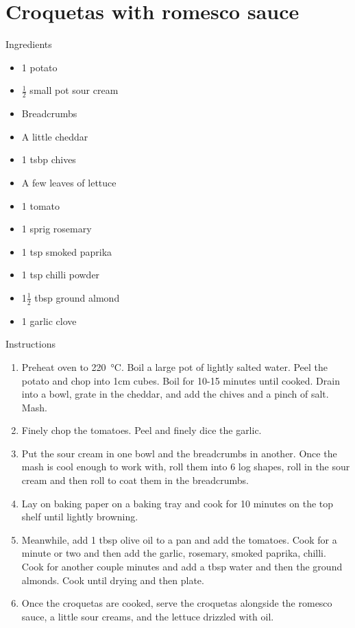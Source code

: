 \documentclass[../dinner.tex]{subfiles}
\begin{document}
	\pagestyle{fancy}
	\fancyhf{}
	\newpage
	\section{Croquetas with romesco sauce}
	\lhead{}
	{\Large Ingredients}
	\begin{multicols}{2}
		\begin{itemize}
			\item 1 potato
			\item \(\frac{1}{2}\) small pot sour cream
			\item Breadcrumbs
			\item A little cheddar
			\item 1 tsbp chives
			\item A few leaves of lettuce
		\end{itemize}
		\columnbreak
		\begin{itemize}
			\item 1 tomato
			\item 1 sprig rosemary
			\item 1 tsp smoked paprika
			\item 1 tsp chilli powder
			\item 1\(\frac{1}{2}\) tbsp ground almond
			\item 1 garlic clove
		\end{itemize}
	\end{multicols}
	
	{\Large Instructions}
	\begin{enumerate}
		\item Preheat oven to \SI{220}{\celsius}. Boil a large pot of lightly salted water. Peel the potato and chop into 1cm cubes. Boil for 10-15 minutes until cooked. Drain into a bowl, grate in the cheddar, and add the chives and a pinch of salt. Mash.
		\item Finely chop the tomatoes. Peel and finely dice the garlic. 
		\item Put the sour cream in one bowl and the breadcrumbs in another. Once the mash is cool enough to work with, roll them into 6 log shapes, roll in the sour cream and then roll to coat them in the breadcrumbs.
		\item Lay on baking paper on a baking tray and cook for 10 minutes on the top shelf until lightly browning.
		\item Meanwhile, add 1 tbsp olive oil to a pan and add the tomatoes. Cook for a minute or two and then add the garlic, rosemary, smoked paprika, chilli. Cook for another couple minutes and add a tbsp water and then the ground almonds. Cook until drying and then plate.
		\item Once the croquetas are cooked, serve the croquetas alongside the romesco sauce, a little sour creams, and the lettuce drizzled with oil.
	\end{enumerate}
\end{document}
